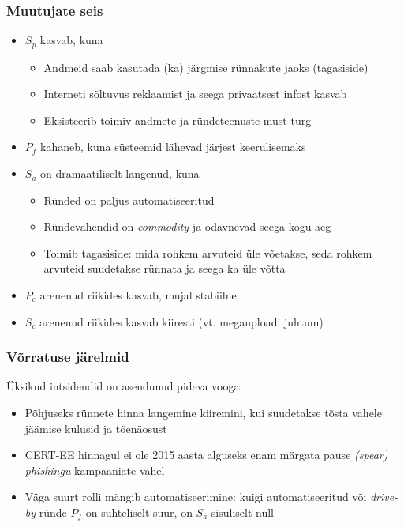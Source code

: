 \begin{frame}[fragile]
  \frametitle{Muutujate seis}
	\begin{itemize}
		\item $S_p$ kasvab, kuna 
			\begin{itemize}
				\item Andmeid saab kasutada (ka) järgmise rünnakute jaoks (tagasiside) 
				\item Interneti sõltuvus reklaamist ja seega privaatsest infost kasvab
				\item Eksisteerib toimiv andmete ja ründeteenuste must turg
			\end{itemize}
		\item $P_f$ kahaneb, kuna süsteemid lähevad järjest keerulisemaks
		\item $S_a$ on dramaatiliselt langenud, kuna 
			\begin{itemize}
				\item Ründed on paljus automatiseeritud
				\item Ründevahendid on \emph{commodity} ja odavnevad seega kogu aeg
				\item Toimib tagasiside: mida rohkem arvuteid üle võetakse, seda rohkem arvuteid suudetakse rünnata ja seega ka üle võtta
			\end{itemize}
		\item $P_c$ arenenud riikides kasvab, mujal stabiilne
		\item $S_c$ arenenud riikides kasvab kiiresti (vt. megauploadi juhtum)
	\end{itemize}
\end{frame}


\begin{frame}[fragile]
  \frametitle{Võrratuse järelmid}
	Üksikud intsidendid on asendunud pideva vooga
	\begin{itemize}
		\item Põhjuseks rünnete hinna langemine kiiremini, kui suudetakse tõsta vahele jäämise kulusid ja tõenäosust
		\item CERT-EE hinnagul ei ole 2015 aasta alguseks enam märgata pause \emph{(spear) phishingu} kampaaniate vahel
		\item Väga suurt rolli mängib automatiseerimine: kuigi automatiseeritud või \emph{drive-by} ründe $P_f$ on suhteliselt suur, on $S_a$ sisuliselt null
	\end{itemize}
\end{frame}

